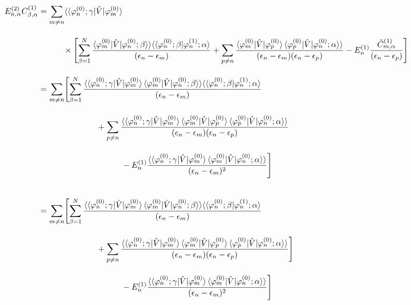 \begin{align}
    E^{(2)}_{n,\alpha}C^{(1)}_{\beta,\alpha}
    &=%
    \sum_{m\neq n}\langle\braket{\varphi^{(0)}_{n};\gamma|\hat{V}|\varphi^{(0)}_m}\nn[10pt]
    &\hspace{30pt}\times\Biggl[\sum_{\beta=1}^N
    \frac{\langle{\varphi^{(0)}_{m}|\hat{V}|\varphi^{(0)}_n;\beta}\rangle\rangle
    \langle\langle{\varphi^{(0)}_n;\beta|\varphi^{(1)}_n;\alpha}\rangle}{(\epsilon_n-\epsilon_m)}
    +\sum_{p\neq n}
    \frac{\langle{\varphi^{(0)}_{m}|\hat{V}|\varphi^{(0)}_p}\rangle
    \braket{\varphi^{(0)}_{p}|\hat{V}|\varphi^{(0)}_n;\alpha}\rangle}
    {(\epsilon_n-\epsilon_m)(\epsilon_n-\epsilon_p)}
    -E^{(1)}_n\frac{\Tilde{C}^{(1)}_{m,\alpha}}{(\epsilon_n-\epsilon_p)}
    \Biggr]\nn[10pt]
    &=
    \sum_{m\neq n}
    \Biggl[\sum_{\beta=1}^N
    \frac{\langle\braket{\varphi^{(0)}_{n};\gamma|\hat{V}|\varphi^{(0)}_m}
    \langle{\varphi^{(0)}_{m}|\hat{V}|\varphi^{(0)}_n;\beta}\rangle\rangle
    \langle\langle{\varphi^{(0)}_n;\beta|\varphi^{(1)}_n;\alpha}\rangle}{(\epsilon_n-\epsilon_m)}\nn[10pt]
    &\hspace{70pt}+\sum_{p\neq n}
    \frac{\langle\braket{\varphi^{(0)}_{n};\gamma|\hat{V}|\varphi^{(0)}_m}
    \langle{\varphi^{(0)}_{m}|\hat{V}|\varphi^{(0)}_p}\rangle
    \braket{\varphi^{(0)}_{p}|\hat{V}|\varphi^{(0)}_n;\alpha}\rangle}
    {(\epsilon_n-\epsilon_m)(\epsilon_n-\epsilon_p)}\nn[10pt]
    &\hspace{100pt}
    -E^{(1)}_n
    \frac{\langle\braket{\varphi^{(0)}_{n};\gamma|\hat{V}|\varphi^{(0)}_m}
    \braket{\varphi^{(0)}_{m}|\hat{V}|\varphi^{(0)}_n;\alpha}\rangle}{(\epsilon_n-\epsilon_m)^2}
    \Biggr]\\[20pt]
    &=
    \sum_{m\neq n}
    \Biggl[\sum_{\beta=1}^N
    \frac{\langle\braket{\varphi^{(0)}_{n};\gamma|\hat{V}|\varphi^{(0)}_m}
    \langle{\varphi^{(0)}_{m}|\hat{V}|\varphi^{(0)}_n;\beta}\rangle\rangle
    \langle\langle{\varphi^{(0)}_n;\beta|\varphi^{(1)}_n;\alpha}\rangle}{(\epsilon_n-\epsilon_m)}\nn[10pt]
    &\hspace{70pt}+\sum_{p\neq n}
    \frac{\langle\braket{\varphi^{(0)}_{n};\gamma|\hat{V}|\varphi^{(0)}_m}
    \langle{\varphi^{(0)}_{m}|\hat{V}|\varphi^{(0)}_p}\rangle
    \braket{\varphi^{(0)}_{p}|\hat{V}|\varphi^{(0)}_n;\alpha}\rangle}
    {(\epsilon_n-\epsilon_m)(\epsilon_n-\epsilon_p)}\Biggr]\nn[10pt]
    &\hspace{100pt}
    -E^{(1)}_n
    \frac{\langle\braket{\varphi^{(0)}_{n};\gamma|\hat{V}|\varphi^{(0)}_m}
    \braket{\varphi^{(0)}_{m}|\hat{V}|\varphi^{(0)}_n;\alpha}\rangle}{(\epsilon_n-\epsilon_m)^2}
    \Biggr]
\end{align}
